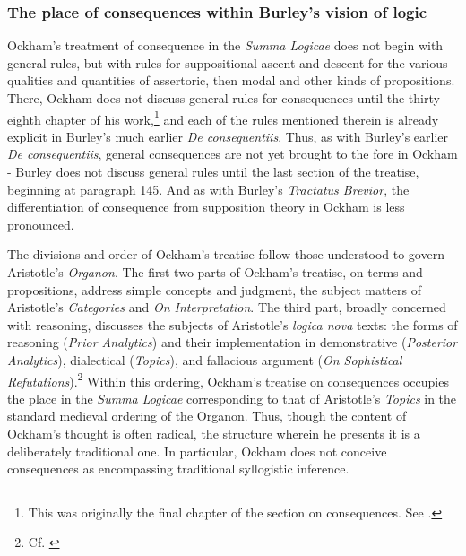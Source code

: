 \documentclass[]{birkjour}
\begin{document}
\subsubsection{The place of consequences within Burley's vision of logic}
Ockham's treatment of consequence in the \textit{Summa Logicae} does not begin with general rules, but with rules for suppositional ascent and descent for the various qualities and quantities of assertoric, then modal and other kinds of propositions. There, Ockham does not discuss general rules for consequences until the thirty-eighth chapter of his work,\footnote{This was originally the final chapter of the section on consequences. See \autocite[pp. 41*-43*]{OckhamSL}.} and each of the rules mentioned therein is already explicit in Burley's much earlier \textit{De consequentiis}. Thus, as with Burley's earlier \textit{De consequentiis}, general consequences are not yet brought to the fore in Ockham - Burley does not discuss general rules until the last section of the treatise, beginning at paragraph 145. And as with Burley's \textit{Tractatus Brevior}, the differentiation of consequence from supposition theory in Ockham is less pronounced.
	
The divisions and order of Ockham's treatise follow those understood to govern Aristotle's \textit{Organon}. The first two parts of Ockham's treatise, on terms and propositions, address simple concepts and judgment, the subject matters of Aristotle's \textit{Categories} and \textit{On Interpretation}. The third part, broadly concerned with reasoning, discusses the subjects of Aristotle's \textit{logica nova} texts: the forms of reasoning (\textit{Prior Analytics}) and their implementation in demonstrative (\textit{Posterior Analytics}), dialectical (\textit{Topics}), and fallacious argument (\textit{On Sophistical Refutations}).\footnote{Cf. \autocite[prol.]{AquinasPA}} Within this ordering, Ockham's treatise on consequences occupies the place in the \textit{Summa Logicae} corresponding to that of Aristotle's \textit{Topics} in the standard medieval ordering of the Organon. Thus, though the content of Ockham's thought is often radical, the structure wherein he presents it is a deliberately traditional one. In particular, Ockham does not conceive consequences as encompassing traditional syllogistic inference.
	
\end{document}
